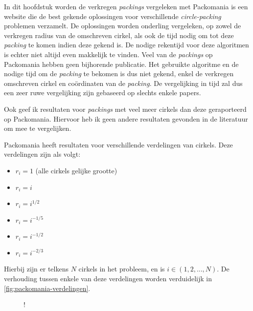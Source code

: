 \documentclass[12pt,a4paper,oneside]{book}
\begin{document}
{In dit hoofdstuk worden de verkregen \textit{packings} vergeleken met %
Packomania is een website die de best gekende oplossingen voor verschillende \textit{circle-packing} problemen verzamelt.
De oplossingen worden onderling vergeleken, op zowel de verkregen radius van de omschreven cirkel, als ook de tijd nodig om tot deze \textit{packing} te komen indien deze gekend is. %
De nodige rekentijd voor deze algoritmen is echter niet altijd even makkelijk te vinden.
Veel van de \textit{packings} op Packomania hebben geen bijhorende publicatie.
Het gebruikte algoritme en de nodige tijd om de \textit{packing} te bekomen is dus niet gekend, enkel de verkregen omschreven cirkel en coördinaten van de \textit{packing}.
De vergelijking in tijd zal dus een zeer ruwe vergelijking zijn gebaseerd op slechts enkele papers.

Ook geef ik resultaten voor \textit{packings} met veel meer cirkels dan deze geraporteerd op Packomania.
Hiervoor heb ik geen andere resultaten gevonden in de literatuur om mee te vergelijken.

Packomania heeft resultaten voor verschillende verdelingen van cirkels.
Deze verdelingen zijn als volgt:

\begin{itemize}
	\item $r_i=1$ (alle cirkels gelijke grootte)
	\item $r_i=i$
	\item $r_i=i^{1/2}$
	\item $r_i=i^{-1/5}$
	\item $r_i=i^{-1/2}$
	\item $r_i=i^{-2/3}$
\end{itemize}

Hierbij zijn er telkens $N$ cirkels in het probleem, en is $i \in (1,2,...,N)$.
De verhouding tussen enkele van deze verdelingen worden verduidelijk in \autoref{fig:packomania-verdelingen}.

\begin {figure}
	\centering
	 {!} {
		}
\end{figure}}
\end{document}

